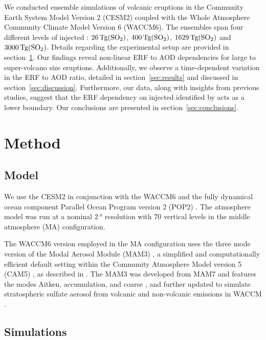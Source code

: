 \documentclass[draft]{agujournal2019}
\begin{document}
  We conducted ensemble simulations of volcanic eruptions in the Community Earth System
  Model Version 2 (CESM2) coupled with the Whole Atmosphere Community Climate Model
  Version 6 (WACCM6). The ensembles span four different levels of injected :
  \(\SI{26}{\tera\gram(\ce{SO2})}\), \(\SI{400}{\tera\gram(\ce{SO2})}\),
  \(\SI{1629}{\tera\gram(\ce{SO2})}\) and \(\SI{3000}{\tera\gram(\ce{SO2})}\). Details
  regarding the experimental setup are provided in section~\ref{sec:method}. Our
  findings reveal non-linear ERF to AOD dependencies for large to super-volcano size
  eruptions. Additionally, we observe a time-dependent variation in the ERF to AOD
  ratio, detailed in section~\ref{sec:results} and discussed in
  section~\ref{sec:discussion}. Furthermore, our data, along with insights from previous
  studies, suggest that the ERF dependency on injected  identified by
   acts as a lower boundary. Our conclusions are presented in
  section~\ref{sec:conclusions}.

  \section{Method}

  \label{sec:method}

  \subsection{Model}

  We use the CESM2 \cite{danabasoglu2020} in conjunction with the WACCM6
  \cite{gettleman2019} and the fully dynamical ocean component Parallel Ocean Program
  version 2 (POP2) \cite{smith2010, danabasoglu2020}. The atmosphere model was run at a
  nominal \(\SI{2}{\degree}\) resolution with \(70\) vertical levels in the middle
  atmosphere (MA) configuration.

  The WACCM6 version employed in the MA configuration uses the three mode version of the
  Modal Aerosol Module (MAM3) \cite{gettleman2019}, a simplified and computationally
  efficient default setting within the Community Atmosphere Model version 5 (CAM5)
  \cite{liu2016}, as described in . The MAM3 was developed from MAM7 and
  features the modes Aitken, accumulation, and coarse \cite{liu2016}, and further
  updated to simulate stratospheric sulfate aerosol from volcanic and non-volcanic
  emissions in WACCM \cite{mills2016}.

  \subsection{Simulations}
\end{document}

